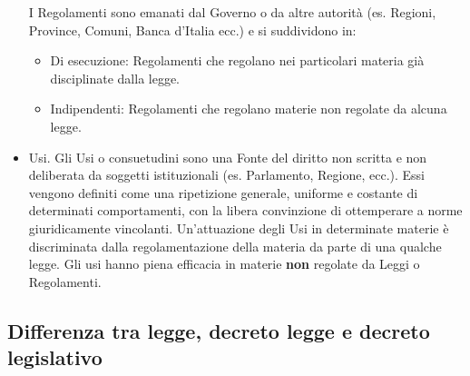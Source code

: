 \begin{itemize}
    I Regolamenti sono emanati dal Governo o da altre autorità (es. Regioni, Province, Comuni, Banca d'Italia ecc.) e
    si suddividono in:
    \begin{itemize}
        \item Di esecuzione: Regolamenti che regolano nei particolari materia già disciplinate dalla
        legge.
        \item Indipendenti: Regolamenti che regolano materie non regolate da alcuna legge.
    \end{itemize}
    \item Usi. \newline
    Gli Usi o consuetudini sono una Fonte del diritto non scritta e non deliberata da soggetti 
    istituzionali (es. Parlamento, Regione, ecc.). Essi vengono definiti come una ripetizione
    generale, uniforme e costante di determinati comportamenti, con la libera convinzione di ottemperare
    a norme giuridicamente vincolanti.\newline
    Un'attuazione degli Usi in determinate materie è discriminata dalla regolamentazione della materia da parte 
    di una qualche legge. Gli usi hanno piena efficacia in materie \textbf{non} regolate da Leggi o Regolamenti.
\end{itemize}

\subsection{Differenza tra legge, decreto legge e decreto legislativo}

